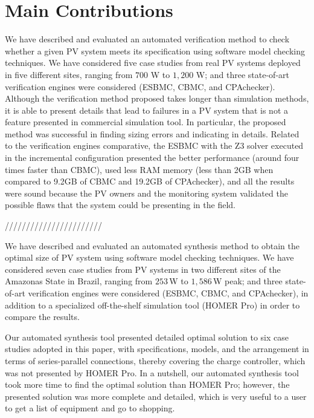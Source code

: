 \section{Main Contributions}

We have described and evaluated an automated verification method to check whether a given PV system meets its specification using software model checking techniques. We have considered five case studies from real PV systems deployed in five different sites, ranging from $700$ W to $1,200$ W; and three state-of-art verification engines were considered (ESBMC, CBMC, and CPAchecker). Although the verification method proposed takes longer than simulation methods, it is able to present details that lead to failures in a PV system that is not a feature presented in commercial simulation tool. In particular, the proposed method was successful in finding sizing errors and indicating in details. Related to the verification engines comparative, the ESBMC with the Z3 solver executed in the incremental configuration presented the better performance (around four times faster than CBMC), used less RAM memory (less than 2GB when compared to 9.2GB of CBMC and 19.2GB of CPAchecker), and all the results were sound because the PV owners and the monitoring system validated the possible flaws that the system could be presenting in the field.

///////////////////////

We have described and evaluated an automated synthesis method 
to obtain the optimal size of PV system using software model 
checking techniques. We have considered seven case studies 
from PV systems in two different sites of the Amazonas State 
in Brazil, ranging from $253$\,W to $1,586$\,W peak; and 
three state-of-art verification engines were considered 
(ESBMC, CBMC, and CPAchecker), in addition to a specialized 
off-the-shelf simulation tool (HOMER Pro) in order to compare the results.

Our automated synthesis tool presented detailed optimal solution 
to six case studies adopted in this paper, with specifications, 
models, and the arrangement in terms of series-parallel connections, 
thereby covering the charge controller, which was not presented by HOMER Pro. 
In a nutshell, our automated synthesis tool took more time 
to find the optimal solution than HOMER Pro; however, the presented 
solution was more complete and detailed, which is very useful 
to a user to get a list of equipment and go to shopping.



